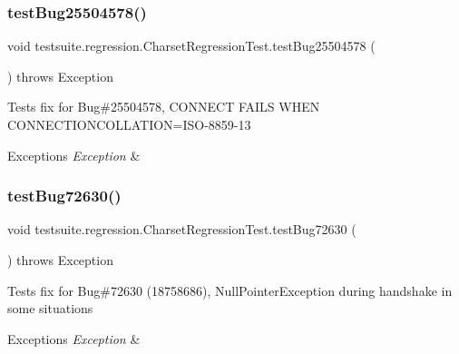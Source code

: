 \subsubsection{\texorpdfstring{test\+Bug25504578()}{testBug25504578()}}
{\footnotesize\ttfamily void testsuite.\+regression.\+Charset\+Regression\+Test.\+test\+Bug25504578 (\begin{DoxyParamCaption}{ }\end{DoxyParamCaption}) throws Exception}

Tests fix for Bug\#25504578, C\+O\+N\+N\+E\+CT F\+A\+I\+LS W\+H\+EN C\+O\+N\+N\+E\+C\+T\+I\+O\+N\+C\+O\+L\+L\+A\+T\+I\+ON=I\+S\+O-\/8859-\/13


\begin{DoxyExceptions}{Exceptions}
{\em Exception} & \\
\hline
\end{DoxyExceptions}
\mbox{\label{classtestsuite_1_1regression_1_1_charset_regression_test_aea47a9d0535dd2e8b09f2be63c4c5100}} 
\subsubsection{\texorpdfstring{test\+Bug72630()}{testBug72630()}}
{\footnotesize\ttfamily void testsuite.\+regression.\+Charset\+Regression\+Test.\+test\+Bug72630 (\begin{DoxyParamCaption}{ }\end{DoxyParamCaption}) throws Exception}

Tests fix for Bug\#72630 (18758686), Null\+Pointer\+Exception during handshake in some situations


\begin{DoxyExceptions}{Exceptions}
{\em Exception} & \\
\hline
\end{DoxyExceptions}
\mbox{\label{classtestsuite_1_1regression_1_1_charset_regression_test_a46c2702ffcbb3408a1b7fe21ba7b02d5}} 
